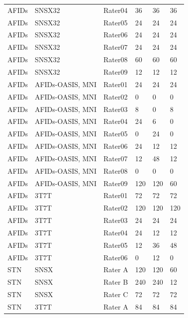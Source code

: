 \begin{table}[htbp]
\begin{tabular}{llllll}
AFIDs & SNSX32 & Rater04 & 36 & 36 & 36 \\
AFIDs & SNSX32 & Rater05 & 24 & 24 & 24 \\
AFIDs & SNSX32 & Rater06 & 24 & 24 & 24 \\
AFIDs & SNSX32 & Rater07 & 24 & 24 & 24 \\
AFIDs & SNSX32 & Rater08 & 60 & 60 & 60 \\
AFIDs & SNSX32 & Rater09 & 12 & 12 & 12 \\
AFIDs & AFIDs-OASIS, MNI & Rater01 & 24 & 24 & 24 \\
AFIDs & AFIDs-OASIS, MNI & Rater02 & 0 & 0 & 0 \\
AFIDs & AFIDs-OASIS, MNI & Rater03 & 8 & 0 & 8 \\
AFIDs & AFIDs-OASIS, MNI & Rater04 & 24 & 6 & 0 \\
AFIDs & AFIDs-OASIS, MNI & Rater05 & 0 & 24 & 0 \\
AFIDs & AFIDs-OASIS, MNI & Rater06 & 24 & 12 & 12 \\
AFIDs & AFIDs-OASIS, MNI & Rater07 & 12 & 48 & 12 \\
AFIDs & AFIDs-OASIS, MNI & Rater08 & 0 & 0 & 0 \\
AFIDs & AFIDs-OASIS, MNI & Rater09 & 120 & 120 & 60 \\
AFIDs & 3T7T & Rater01 & 72 & 72 & 72 \\
AFIDs & 3T7T & Rater02 & 120 & 120 & 120 \\
AFIDs & 3T7T & Rater03 & 24 & 24 & 24 \\
AFIDs & 3T7T & Rater04 & 24 & 12 & 12 \\
AFIDs & 3T7T & Rater05 & 12 & 36 & 48 \\
AFIDs & 3T7T & Rater06 & 0 & 12 & 0 \\
STN & SNSX & Rater A & 120 & 120 & 60 \\
STN & SNSX & Rater B & 240 & 240 & 12 \\
STN & SNSX & Rater C & 72 & 72 & 72 \\
STN & 3T7T & Rater A & 84 & 84 & 84 \\
\bottomrule
\end{tabular}
\label{tab:rater_demographic_data}
\end{table}